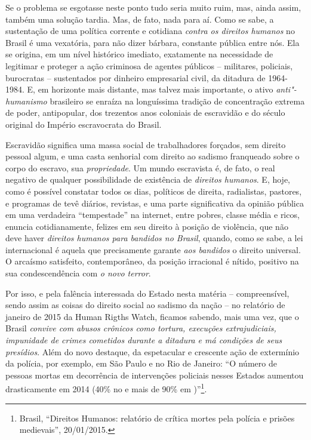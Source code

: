 Se o problema se esgotasse neste ponto tudo seria muito ruim, mas, ainda
assim, também uma solução tardia. Mas, de fato, nada para aí. Como se
sabe, a sustentação de uma política corrente e cotidiana \emph{contra os
direitos humanos} no Brasil é uma vexatória, para não dizer bárbara,
constante pública entre nós. Ela se origina, em um nível histórico
imediato, exatamente na necessidade de legitimar e proteger a ação
criminosa de agentes públicos -- militares, policiais, burocratas --
sustentados por dinheiro empresarial civil, da ditadura de 1964-1984. E,
em horizonte mais distante, mas talvez mais importante, o ativo
\emph{anti"-humanismo} brasileiro se enraíza na longuíssima tradição de
concentração extrema de poder, antipopular, dos trezentos anos coloniais
de escravidão e do século original do Império escravocrata do Brasil.

Escravidão significa uma massa social de trabalhadores forçados, sem
direito pessoal algum, e uma casta senhorial com direito ao sadismo
franqueado sobre o corpo do escravo, sua \emph{propriedade}. Um mundo
escravista é, de fato, o real negativo de qualquer possibilidade de
existência de \emph{direitos humanos}. E, hoje, como é possível
constatar todos os dias, políticos de direita, radialistas, pastores, e
programas de tevê diários, revistas, e uma parte significativa da
opinião pública em uma verdadeira ``tempestade'' na internet, entre
pobres, classe média e ricos, enuncia cotidianamente, felizes em seu
direito à posição de violência, que não deve haver \emph{direitos
humanos para bandidos no Brasil}, quando, como se sabe, a lei
internacional é aquela que precisamente garante \emph{aos bandidos} o
direito universal. O arcaísmo satisfeito, contemporâneo, da posição
irracional é nítido, positivo na sua condescendência com \emph{o novo
terror}.

Por isso, e pela falência interessada do Estado nesta matéria --
compreensível, sendo assim as coisas do direito social ao sadismo da
nação -- no relatório de janeiro de 2015 da Human Rigths Watch, ficamos
sabendo, mais uma vez, que o Brasil \emph{convive com abusos crônicos
como tortura, execuções extrajudiciais, impunidade de crimes cometidos
durante a ditadura e má condições de seus presídios}. Além do novo
destaque, da espetacular e crescente ação de extermínio da polícia, por
exemplo, em São Paulo e no Rio de Janeiro: ``O número de pessoas mortas
em decorrência de intervenções policiais nesses Estados aumentou
drasticamente em 2014 (40\% no  e mais de 90\% em )''\footnote{
  Brasil, ``Direitos Humanos: relatório de  crítica mortes pela
  polícia e prisões medievais'', 20/01/2015.}.

